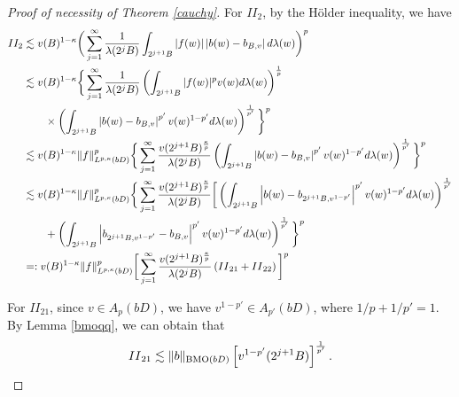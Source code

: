 \documentclass[11pt,a4paper]{amsart}
\numberwithin{equation}{section}
\begin{document}
{\begin{proof}[Proof of necessity of  Theorem \ref{cauchy}]
For ${II}_2$, by the H\"older inequality, we have
\begin{align*}
II_2&\lesssim v(B)^{1-\kappa}\bigg(\sum_{j=1}^{\infty}{1\over \lambda(2^jB)}\int_{2^{j+1}B}|f(w)| \left| b(w)-b_{B,v}\right| d\lambda(w) \bigg)^p \\
&\lesssim v(B)^{1-\kappa}\bigg\{\sum_{j=1}^{\infty}{1\over \lambda(2^jB)}\left(\int_{2^{j+1}B}|f(w)|^p v(w)d\lambda(w)\right)^{1\over p}\\
&\qquad \times\left(\int_{2^{j+1}B} \left| b(w)-b_{B,v}\right| ^{p'}v(w)^{1-p'}d\lambda(w)\right)^{1\over p'} \bigg\}^p\\
 &\lesssim v(B)^{1-\kappa}\|f\|^p_{L^{p,\kappa}(bD)}\bigg\{\sum_{j=1}^{\infty}{v(2^{j+1}B)^{\kappa\over p}\over \lambda(2^jB)}
\left(\int_{2^{j+1}B} \left| b(w)-b_{B,v}\right| ^{p'}v(w)^{1-p'}d\lambda(w)\right)^{1\over p'} \bigg\}^p\\
 &\lesssim v(B)^{1-\kappa}\|f\|^p_{L^{p,\kappa}(bD)}\bigg\{\sum_{j=1}^{\infty}{v(2^{j+1}B)^{\kappa\over p}\over \lambda(2^jB)}
\bigg[\left(\int_{2^{j+1}B} \left| b(w)-b_{2^{j+1}B,v^{1-p'}}\right| ^{p'}v(w)^{1-p'}d\lambda(w)\right)^{1\over p'}\\
&\qquad+\left(\int_{2^{j+1}B} \left| b_{2^{j+1}B,v^{1-p'}}-b_{B,v}\right| ^{p'}v(w)^{1-p'}d\lambda(w)\right)^{1\over p'} \bigg\}^p\\
&=: v(B)^{1-\kappa}\|f\|^p_{L^{p,\kappa}(bD)}\bigg[\sum_{j=1}^{\infty}{v(2^{j+1}B)^{\kappa\over p}\over \lambda(2^jB)}\left({II}_{21}+{II}_{22} \right)\bigg]^p
\end{align*}



For ${II}_{21}$, since $v\in A_p(bD)$, we have $v^{1-p'}\in A_{p'}(bD)$, where $1/p+1/p'=1$. By Lemma \ref{bmoqq}, we can obtain that
$${II}_{21}\lesssim\|b\|_{{\rm {BMO}}(bD)}\left[v^{1-p'}(2^{j+1}B)\right]^{1\over p'}.$$


\end{proof}}
\end{document}
